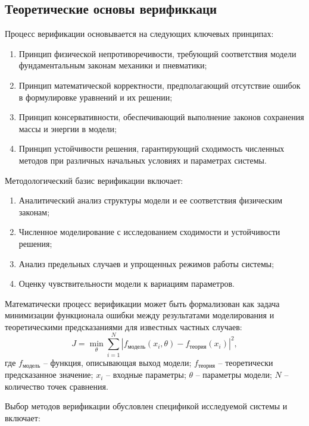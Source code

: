 \subsection{Теоретические основы верификкаци}\label{sec:ch2/sec7/subsec1}
Процесс верификации основывается на следующих ключевых принципах:

\begin{enumerate}
    \item Принцип физической непротиворечивости, требующий соответствия модели фундаментальным законам механики и пневматики;
    \item Принцип математической корректности, предполагающий отсутствие ошибок в формулировке уравнений и их решении;
    \item Принцип консервативности, обеспечивающий выполнение законов сохранения массы и энергии в модели;
    \item Принцип устойчивости решения, гарантирующий сходимость численных методов при различных начальных условиях и параметрах системы.
\end{enumerate}

Методологический базис верификации включает:

\begin{enumerate}
    \item Аналитический анализ структуры модели и ее соответствия физическим законам;
    \item Численное моделирование с исследованием сходимости и устойчивости решения;
    \item Анализ предельных случаев и упрощенных режимов работы системы;
    \item Оценку чувствительности модели к вариациям параметров.
\end{enumerate}

Математически процесс верификации может быть формализован как задача минимизации функционала
ошибки между результатами моделирования и теоретическими предсказаниями для известных частных случаев:
\begin{equation*}
    J = \min_{\theta} \sum_{i=1}^{N} \left| f_{\text{модель}}(x_i, \theta) - f_{\text{теория}}(x_i) \right|^2,
\end{equation*}
где $f_{\text{модель}}$ -- функция, описывающая выход модели;
$f_{\text{теория}}$ -- теоретически предсказанное значение;
$x_i$ -- входные параметры;
$\theta$ -- параметры модели;
$N$ -- количество точек сравнения.

Выбор методов верификации обусловлен спецификой исследуемой системы и включает:

